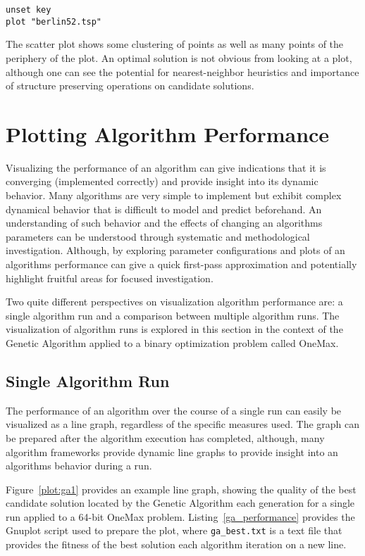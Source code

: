 \documentclass[a4paper, 11pt]{article}
\begin{document}
\begin{lstlisting}[caption=Gnuplot script for plotting the Berlin52 Traveling Salesman Problem., label=tsp1]
unset key
plot "berlin52.tsp"
\end{lstlisting}

The scatter plot shows some clustering of points as well as many points of the periphery of the plot. An optimal solution is not obvious from looking at a plot, although one can see the potential for nearest-neighbor heuristics and importance of structure preserving operations on candidate solutions.

%
%
\section{Plotting Algorithm Performance}
Visualizing the performance of an algorithm can give indications that it is converging (implemented correctly) and provide insight into its dynamic behavior. Many algorithms are very simple to implement but exhibit complex dynamical behavior that is difficult to model and predict beforehand. An understanding of such behavior and the effects of changing an algorithms parameters can be understood through systematic and methodological investigation. Although, by exploring parameter configurations and plots of an algorithms performance can give a quick first-pass approximation and potentially highlight fruitful areas for focused investigation.

Two quite different perspectives on visualization algorithm performance are: a single algorithm run and a comparison between multiple algorithm runs. The visualization of algorithm runs is explored in this section in the context of the Genetic Algorithm applied to a binary optimization problem called OneMax.

\subsection{Single Algorithm Run}
The performance of an algorithm over the course of a single run can easily be visualized as a line graph, regardless of the specific measures used. The graph can be prepared after the algorithm execution has completed, although, many algorithm frameworks provide dynamic line graphs to provide insight into an algorithms behavior during a run.

Figure~\ref{plot:ga1} provides an example line graph, showing the quality of the best candidate solution located by the Genetic Algorithm each generation for a single run applied to a 64-bit OneMax problem. Listing~\ref{ga_performance} provides the Gnuplot script used to prepare the plot, where \texttt{ga\_best.txt} is a text file that provides the fitness of the best solution each algorithm iteration on a new line.
\end{document}
